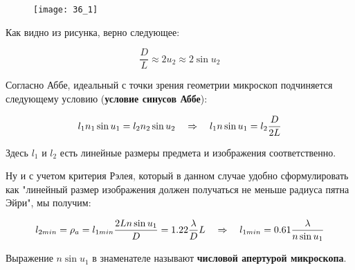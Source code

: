 \begin{figure}[H]
	\centering
	\texttt{[image: 36\_1]}
\end{figure}

Как видно из рисунка, верно следующее:

\begin{equation*}
	\frac{D}{L} \approx 2 u_2 \approx 2 \sin u_2
\end{equation*}

Согласно Аббе, идеальный с точки зрения геометрии микроскоп подчиняется следующему условию (\textbf{условие синусов Аббе}):

\begin{equation*}
	l_1 n_1 \sin u_1 = l_2 n_2 \sin u_2 \quad \Rightarrow \quad l_1 n \sin u_1 = l_2 \frac{D}{2L}
\end{equation*}

Здесь $l_1$ и $l_2$ есть линейные размеры предмета и изображения соответственно.

Ну и с учетом критерия Рэлея, который в данном случае удобно сформулировать как "линейный размер изображения должен получаться не меньше радиуса пятна Эйри", мы получим:

\begin{equation*}
	l_{2 min} = \rho_a = l_{1 min} \frac{2 L n\sin u_1}{D} = 1.22 \frac{\lambda}{D} L \quad \Rightarrow \quad l_{1 min} = 0.61 \frac{\lambda}{n\sin u_1}
\end{equation*}

Выражение $n \sin u_1$ в знаменателе называют \textbf{числовой апертурой микроскопа}.